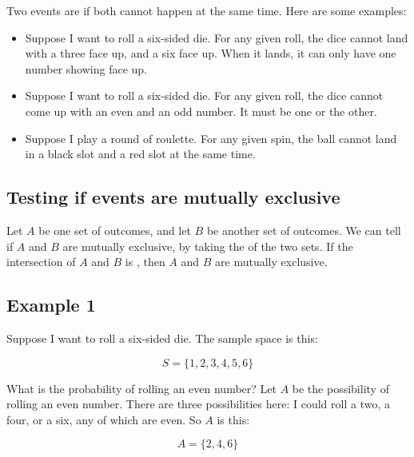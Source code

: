 \documentclass[../../../main.tex]{subfiles}
\begin{document}
Two events are  if both cannot happen at the same time. Here are some examples:

\begin{itemize}

  \item Suppose I want to roll a six-sided die. For any given roll, the dice cannot land with a three face up, and a six face up. When it lands, it can only have one number showing face up.

  \item Suppose I want to roll a six-sided die. For any given roll, the dice cannot come up with an even and an odd number. It must be one or the other.

  \item Suppose I play a round of roulette. For any given spin, the ball cannot land in a black slot and a red slot at the same time.

\end{itemize}


\subsection{Testing if events are mutually exclusive}

Let $A$ be one set of outcomes, and let $B$ be another set of outcomes. We can tell if $A$ and $B$ are mutually exclusive, by taking the  of the two sets. If the intersection of $A$ and $B$ is , then $A$ and $B$ are mutually exclusive. 


\subsection{Example 1}

Suppose I want to roll a six-sided die. The sample space is this:

\begin{equation*}
  S = \{ 1, 2, 3, 4, 5, 6 \}
\end{equation*}

\noindent
What is the probability of rolling an even number? Let $A$ be the possibility of rolling an even number. There are three possibilities here: I could roll a two, a four, or a six, any of which are even. So $A$ is this:

\begin{equation*}
  A = \{ 2, 4, 6 \}
\end{equation*}
\end{document}
